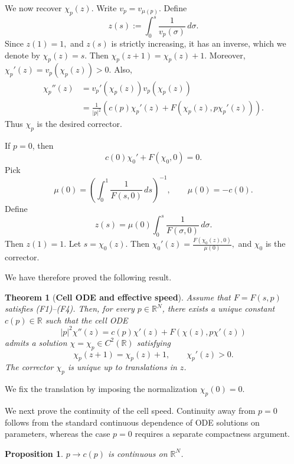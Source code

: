 \documentclass[preprint]{elsarticle}
\newtheorem{result}{\textbf{Theorem}}
\newtheorem{proposition}{Proposition}[section]
\numberwithin{equation}{section}
\begin{document}
We now recover $\chi_p(z)$. Write
$
v_p=v_{\mu(p)}.
$
Define
\begin{equation*}
z(s):=\int_0^s\frac{1}{v_p(\sigma)}\,d\sigma.
\end{equation*}
Since
$
z(1)=1,
$
and $z(s)$ is strictly increasing, it has an inverse, which we denote by
$
\chi_p(z)=s.
$
Then
$
\chi_p(z+1)=\chi_p(z)+1.
$
Moreover,
$
\chi_p'(z)=v_p(\chi_p(z))>0.
$
Also,
\begin{align*}
\chi_p''(z)
&=
v_p'(\chi_p(z))v_p(\chi_p(z)) \\
&=
\frac1{|p|^2}\left(c(p)\chi_p'(z)+F(\chi_p(z),p\chi_p'(z))\right).
\end{align*}
Thus $\chi_p$ is the desired corrector.

If $p=0$, then
\begin{equation*}
c(0)\chi_0'+F(\chi_0,0)=0.
\end{equation*}
Pick
\begin{equation*}
\mu(0)=\left(\int_0^1\frac{1}{F(s,0)}\,ds\right)^{-1},
\qquad
\mu(0)=-c(0).
\end{equation*}
Define
\begin{equation*}
z(s)=\mu(0)\int_0^s\frac{1}{F(\sigma,0)}\,d\sigma.
\end{equation*}
Then $z(1)=1$. Let
$
s=\chi_0(z).
$
Then
$
\chi_0'(z)=\frac{F(\chi_0(z),0)}{\mu(0)},
$
and $\chi_0$ is the corrector.

We have therefore proved the following result.

\begin{result}[\textbf{Cell ODE and effective speed}]
Assume that $F=F(s,p)$ satisfies \textup{(F1)--(F4)}. Then, for every $p\in\mathbb R^N$, there exists a unique constant $c(p)\in\mathbb R$ such that the cell ODE
\begin{equation*}
|p|^2\chi''(z)=c(p)\chi'(z)+F(\chi(z),p\chi'(z))
\end{equation*}
admits a solution $\chi=\chi_p\in C^2(\mathbb R)$ satisfying
\begin{equation*}
\chi_p(z+1)=\chi_p(z)+1,\qquad \chi_p'(z)>0.
\end{equation*}
The corrector $\chi_p$ is unique up to translations in $z$.
\end{result}
We fix the translation by imposing the normalization $\chi_p(0)=0$.

We next prove the continuity of the cell speed. Continuity away from $p=0$ follows from the standard continuous dependence of ODE solutions on parameters, whereas the case $p=0$ requires a separate compactness argument.
\begin{proposition}
 $p\to c(p)$ is continuous on $\mathbb R^N$.\label{continuity}
\end{proposition}
\end{document}
